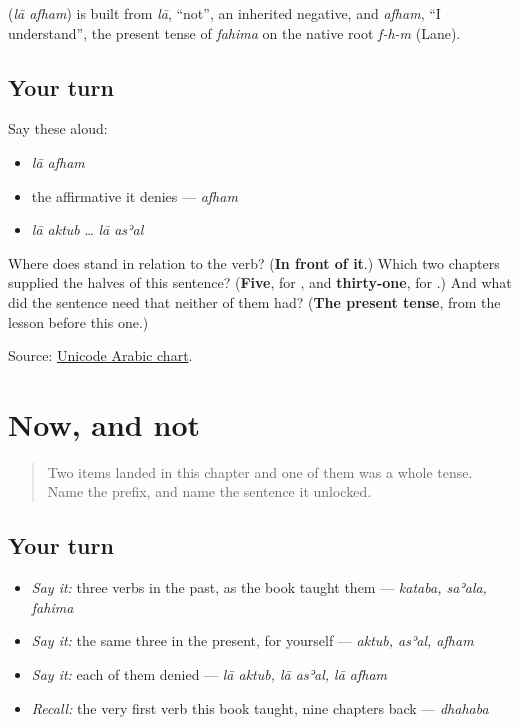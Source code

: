 \begin{cousinweb}
\textbf{ } (\emph{lā afham}) is built from \emph{lā}, \textquotedblleft{}not\textquotedblright{}, an inherited negative, and \emph{afham}, \textquotedblleft{}I understand\textquotedblright{}, the present tense of \emph{fahima} on the native root \emph{f-h-m} (Lane).
\end{cousinweb}

\subsection*{Your turn}
Say these aloud:

\begin{itemize}
\raggedright
  \item \emph{lā afham}
  \item the affirmative it denies — \emph{afham}
  \item \emph{lā aktub} … \emph{lā asʾal}
\end{itemize}

\begin{tcolorbox}[breakable,colback=teal!4,colframe=teal!35!black,title={Before you move on}]
Where does \textbf{} stand in relation to the verb? (\textbf{In front of it}.) Which two chapters supplied the halves of this sentence? (\textbf{Five}, for \textbf{}, and \textbf{thirty-one}, for \textbf{}.) And what did the sentence need that neither of them had? (\textbf{The present tense}, from the lesson before this one.)

Source: \href{https://www.unicode.org/charts/PDF/U0600.pdf}{Unicode Arabic chart}.
\end{tcolorbox}
\section[\texorpdfstring{\ar{أكتب} · \ar{لا} \ar{أفهم} (aktub · lā afham)}{أكتب · لا أفهم (aktub · lā afham)}]{Now, and not}

\label{lesson:AR-R37-now-and-not}



\begin{quote}
Two items landed in this chapter and one of them was a whole tense. Name the prefix, and name the sentence it unlocked.
\end{quote}

\subsection*{Your turn}
\begin{itemize}
\raggedright
  \item \emph{Say it:} three verbs in the past, as the book taught them — \emph{kataba, saʾala, fahima}
  \item \emph{Say it:} the same three in the present, for yourself — \emph{aktub, asʾal, afham}
  \item \emph{Say it:} each of them denied — \emph{lā aktub, lā asʾal, lā afham}
  \item \emph{Recall:} the very first verb this book taught, nine chapters back — \emph{dhahaba}
\end{itemize}

